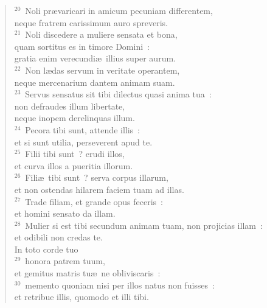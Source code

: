 \begin{verse}${}^{20}$~Noli pr\ae varicari in amicum pecuniam differentem,\\ neque fratrem carissimum auro spreveris.\\
${}^{21}$~Noli discedere a muliere sensata et bona,\\ quam sortitus es in timore Domini~:\\ gratia enim verecundi\ae\ illius super aurum.\\
${}^{22}$~Non l\ae das servum in veritate operantem,\\ neque mercenarium dantem animam suam.\\
${}^{23}$~Servus sensatus sit tibi dilectus quasi anima tua~:\\ non defraudes illum libertate,\\ neque inopem derelinquas illum.\\
${}^{24}$~Pecora tibi sunt, attende illis~:\\ et si sunt utilia, perseverent apud te.\\
${}^{25}$~Filii tibi sunt~? erudi illos,\\ et curva illos a pueritia illorum.\\
${}^{26}$~Fili\ae\ tibi sunt~? serva corpus illarum,\\ et non ostendas hilarem faciem tuam ad illas.\\
${}^{27}$~Trade filiam, et grande opus feceris~:\\ et homini sensato da illam.\\
${}^{28}$~Mulier si est tibi secundum animam tuam, non projicias illam~:\\ et odibili non credas te.\\ In toto corde tuo\\
${}^{29}$~honora patrem tuum,\\ et gemitus matris tu\ae\ ne obliviscaris~:\\
${}^{30}$~memento quoniam nisi per illos natus non fuisses~:\\ et retribue illis, quomodo et illi tibi.\end{verse}



